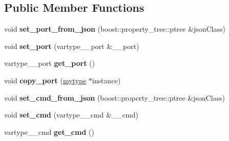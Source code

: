\subsection*{Public Member Functions}
\begin{DoxyCompactItemize}
\item 
\mbox{\label{classfilter_1_1algos_1_1_stream_result_filter_a18055e080f5fbedc07e36df252dd9761}} 
void {\bfseries set\+\_\+port\+\_\+from\+\_\+json} (boost\+::property\+\_\+tree\+::ptree \&json\+Class)
\item 
\mbox{\label{classfilter_1_1algos_1_1_stream_result_filter_acefcf78b3905598b64d5c5e005b18034}} 
void {\bfseries set\+\_\+port} (vartype\+\_\+\+\_\+port \&\+\_\+\+\_\+port)
\item 
\mbox{\label{classfilter_1_1algos_1_1_stream_result_filter_a4b4e8f3aecd4e0385e3ff52a10e59100}} 
vartype\+\_\+\+\_\+port {\bfseries get\+\_\+port} ()
\item 
\mbox{\label{classfilter_1_1algos_1_1_stream_result_filter_ad97d13357607b1057d8fd7f5fad88a81}} 
void {\bfseries copy\+\_\+port} (\hyperlink{classfilter_1_1algos_1_1_stream_result_filter}{mytype} $\ast$instance)
\item 
\mbox{\label{classfilter_1_1algos_1_1_stream_result_filter_a891fd9e616d04cda828547e87e03cbf6}} 
void {\bfseries set\+\_\+cmd\+\_\+from\+\_\+json} (boost\+::property\+\_\+tree\+::ptree \&json\+Class)
\item 
\mbox{\label{classfilter_1_1algos_1_1_stream_result_filter_a4c08cfd57d4ff72b653fb924a0fac77f}} 
void {\bfseries set\+\_\+cmd} (vartype\+\_\+\+\_\+cmd \&\+\_\+\+\_\+cmd)
\item 
\mbox{\label{classfilter_1_1algos_1_1_stream_result_filter_aff79ec0d7c8285a698bc9d9f27362ee0}} 
vartype\+\_\+\+\_\+cmd {\bfseries get\+\_\+cmd} ()
\item 
\mbox{\label{classfilter_1_1algos_1_1_stream_result_filter_a169639f3e12c24956eb1aacb51e96b8c}} 

\end{DoxyCompactItemize}
